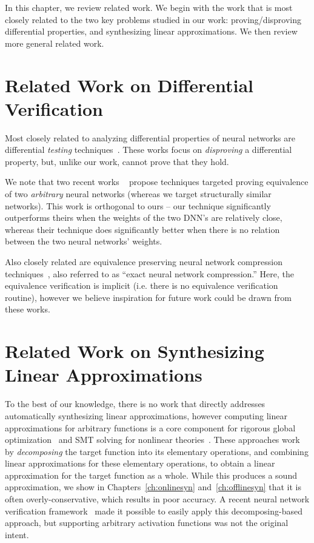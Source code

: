 In this chapter, we review related work. We begin with the work that is most
closely related to the two key problems studied in our work: proving/disproving
differential properties, and synthesizing linear approximations. We then review
more general related work.

\section{Related Work on Differential Verification}
Most closely related to analyzing differential properties of neural networks are
differential \textit{testing} techniques~\cite{xie2019diffchaser, PeiCYJ17,
MaLLZG18, asyrofi2021can}. These works focus on \textit{disproving} a differential
property, but, unlike our work, cannot prove that they hold.

We note that two recent works ~\cite{teuber2021geometric,kleine2020verifying}
propose techniques targeted proving equivalence of two \textit{arbitrary} neural
networks (whereas we target structurally similar networks). This work is
orthogonal to ours -- our technique significantly outperforms theirs when the
weights of the two DNN's are relatively close, whereas their technique does
significantly better when there is no relation between the two neural networks'
weights.

Also closely related are equivalence preserving neural network compression
techniques~\cite{lahav2021pruning,serra2021scaling}, also referred to as ``exact
neural network compression.'' Here, the equivalence verification is implicit (i.e.
there is no equivalence verification routine), however we believe inspiration for
future work could be drawn from these works.


\section{Related Work on Synthesizing Linear Approximations}
To the best of our knowledge, there is no work that directly addresses
automatically synthesizing linear approximations, however computing linear
approximations for arbitrary functions is a core component for rigorous global
optimization~\cite{chabert2009contractor} and SMT solving for nonlinear
theories~\cite{gao2013dreal}. These approaches work by \textit{decomposing} the
target function into its elementary operations, and combining linear
approximations for these elementary operations, to obtain a linear approximation
for the target function as a whole. While this produces a sound approximation, we
show in Chapters~\ref{ch:onlinesyn} and~\ref{ch:offlinesyn} that it is often
overly-conservative, which results in poor accuracy. A recent neural network
verification framework~\cite{autolipra} made it possible to easily apply this
decomposing-based approach, but supporting arbitrary activation functions was not
the original intent.

